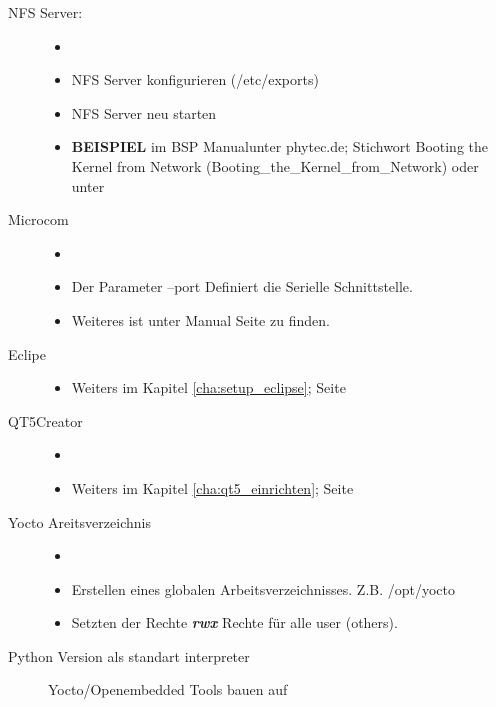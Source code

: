 \begin{description}
    \item[NFS Server:]
        \begin{itemize}
            \item[ ]
            \item NFS Server konfigurieren (/etc/exports)
            \item NFS Server neu starten
            \item \textbf{BEISPIEL} im \glqq BSP Manual\grqq unter  phytec.de;
                    Stichwort \glqq Booting the Kernel from Network\grqq
                (Booting\_the\_Kernel\_from\_Network) \cite{Pytec:BSP_Manual}
                oder unter \cite[Seite
                45]{Gonzalez2018:Embedded_Linux_Development_Using_Yocto_Project_Cookbook_2nd}
        \end{itemize}
    \item[Microcom]
        \begin{itemize}
            \item[ ]
            \item Der Parameter --port Definiert die Serielle Schnittstelle.
            \item Weiteres ist unter Manual Seite zu finden.
        \end{itemize}
    \item[Eclipe]
        \begin{itemize}
            \item Weiters im Kapitel \ref{cha:setup_eclipse}; Seite
                \pageref{cha:setup_eclipse}
        \end{itemize}
    \item[QT5Creator]
        \begin{itemize}
            \item[ ]
            \item Weiters im Kapitel \ref{cha:qt5_einrichten}; Seite
                \pageref{cha:qt5_einrichten}
        \end{itemize}
    \item[Yocto Areitsverzeichnis]
        \begin{itemize}
            \item[ ]
            \item Erstellen eines globalen Arbeitsverzeichnisses.  Z.B.
                /opt/yocto \item Setzten der Rechte \textbf{ \textit{rwx}}
                Rechte für alle user (\glqq others\grqq).
        \end{itemize}
    \item[Python Version als standart interpreter] Yocto/Openembedded Tools bauen auf

\end{description}

